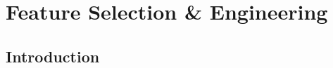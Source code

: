 \chapter{Feature Selection \& Engineering }
\label{ch:chapter06}
 
%
%
\section{Introduction}
\label{sec:chapter06:intro}


